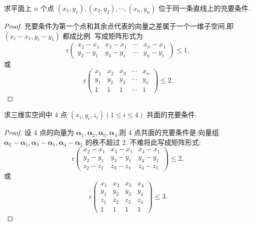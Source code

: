 \documentclass[../../main.tex]{subfiles}%
\begin{document}
\begin{proposition}\label{proposition:平面上点位于同一条直线上的充要条件}
求平面上 \(n\) 个点 \((x_1,y_1),(x_2,y_2),\cdots,(x_n,y_n)\) 位于同一条直线上的充要条件.
\end{proposition}
\begin{proof}
充要条件为第一个点和其余点代表的向量之差属于一个一维子空间,即 \((x_i - x_1,y_i - y_1)\) 都成比例. 写成矩阵形式为
\[
\mathrm{r}\begin{pmatrix}
x_2 - x_1&x_3 - x_1&\cdots&x_n - x_1\\
y_2 - y_1&y_3 - y_1&\cdots&y_n - y_1
\end{pmatrix}\leqslant 1,
\]
或
\[
\mathrm{r}\begin{pmatrix}
x_1&x_2&x_3&\cdots&x_n\\
y_1&y_2&y_3&\cdots&y_n\\
1&1&1&\cdots&1
\end{pmatrix}\leqslant 2. 
\]
\end{proof}

\begin{proposition}\label{proposition:三维实空间中4点共面}
求三维实空间中 4 点 \((x_i,y_i,z_i)(1\leqslant  i\leqslant  4)\) 共面的充要条件.
\end{proposition}
\begin{proof}
设 4 点的向量为 \(\boldsymbol{\alpha}_1,\boldsymbol{\alpha}_2,\boldsymbol{\alpha}_3,\boldsymbol{\alpha}_4\),则 4 点共面的充要条件是:向量组 \(\boldsymbol{\alpha}_2 - \boldsymbol{\alpha}_1,\boldsymbol{\alpha}_3 - \boldsymbol{\alpha}_1,\boldsymbol{\alpha}_4 - \boldsymbol{\alpha}_1\) 的秩不超过 2. 不难将此写成矩阵形式:
\[
\mathrm{r}\begin{pmatrix}
x_2 - x_1&x_3 - x_1&x_4 - x_1\\
y_2 - y_1&y_3 - y_1&y_4 - y_1\\
z_2 - z_1&z_3 - z_1&z_4 - z_1
\end{pmatrix}\leqslant 2,
\]
或
\[
\mathrm{r}\begin{pmatrix}
x_1&x_2&x_3&x_4\\
y_1&y_2&y_3&y_4\\
z_1&z_2&z_3&z_4\\
1&1&1&1
\end{pmatrix}\leqslant 3. 
\]
\end{proof}
\end{document}
